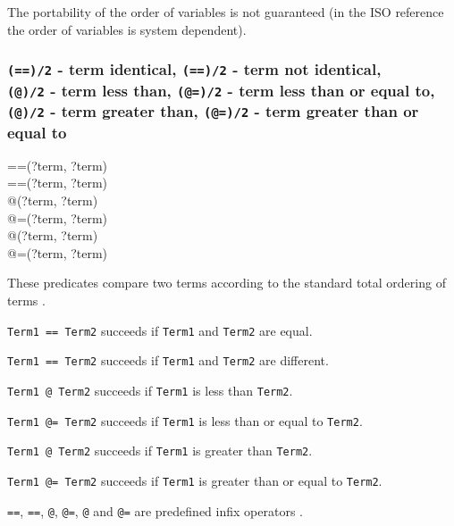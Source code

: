 The portability of the order of variables is not guaranteed (in the ISO
reference the order of variables is system dependent).

\subsubsection{\texttt{(==)/2} - term identical,
               \texttt{({\bs}==)/2} - term not identical, \\
               \texttt{(@{\lt})/2} - term less than,
               \texttt{(@={\lt})/2} - term less than or equal to, \\
               \texttt{(@{\gt})/2} - term greater than,
               \texttt{(@{\gt}=)/2} - term greater than or equal to}
\label{(==)/2} 

\begin{TemplatesTwoCols}
==(?term, ?term)\\
{\bs}==(?term, ?term) \\
@{\lt}(?term, ?term) \\
@={\lt}(?term, ?term)\\
@{\gt}(?term, ?term)\\
@{\gt}=(?term, ?term)

\end{TemplatesTwoCols}

\Description

These predicates compare two terms according to the standard total ordering
of terms .

\texttt{Term1 == Term2} succeeds if \texttt{Term1} and \texttt{Term2} are
equal. 

\texttt{Term1 {\bs}== Term2} succeeds if \texttt{Term1} and
\texttt{Term2} are different.

\texttt{Term1 @{\lt} Term2} succeeds if \texttt{Term1} is less than
\texttt{Term2}.

\texttt{Term1 @={\lt} Term2} succeeds if \texttt{Term1} is less than or
equal to \texttt{Term2}.

\texttt{Term1 @{\gt} Term2} succeeds if \texttt{Term1} is greater than
\texttt{Term2}.

\texttt{Term1 @{\gt}= Term2} succeeds if \texttt{Term1} is greater than
or equal to \texttt{Term2}.

\texttt{==}, \texttt{{\bs}==}, \texttt{@{\lt}}, \texttt{@={\lt}},
\texttt{@{\gt}} and \texttt{@{\gt}=} are predefined infix operators .

